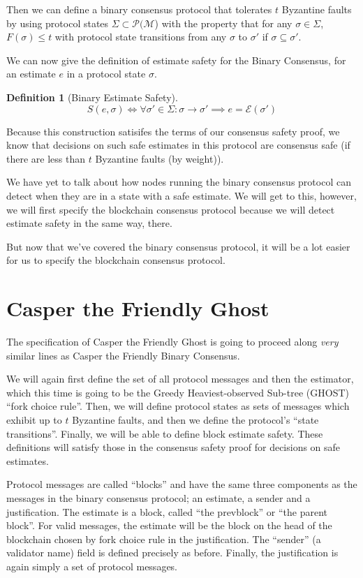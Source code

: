 \documentclass{article}
\theoremstyle{definition}
\newtheorem{defn}{Definition}[section]
\begin{document}
Then we can define a binary consensus protocol that tolerates $t$ Byzantine faults by using protocol states $\Sigma \subset \mathcal{P}(\mathcal{M}$) with the property that for any $\sigma \in \Sigma$, $F(\sigma) \leq t$ with protocol state transitions from any $\sigma$ to $\sigma'$ if $\sigma \subseteq \sigma'$. 

We can now give the definition of estimate safety for the Binary Consensus, for an estimate $e$ in a protocol state $\sigma$.

\begin{defn}[Binary Estimate Safety]
$$
S(e, \sigma) \iff \forall \sigma' \in \Sigma: \sigma \to \sigma' \implies e = \mathcal{E}(\sigma')
$$
\end{defn}

Because this construction satisifes the terms of our consensus safety proof, we know that decisions on such safe estimates in this protocol are consensus safe (if there are less than $t$ Byzantine faults (by weight)).

We have yet to talk about how nodes running the binary consensus protocol can detect when they are in a state with a safe estimate. We will get to this, however, we will first specify the blockchain consensus protocol because we will detect estimate safety in the same way, there.

But now that we've covered the binary consensus protocol, it will be a lot easier for us to specify the blockchain consensus protocol.


\section{Casper the Friendly Ghost}

The specification of Casper the Friendly Ghost is going to proceed along \emph{very} similar lines as Casper the Friendly Binary Consensus.

We will again first define the set of all protocol messages and then the estimator, which this time is going to be the Greedy Heaviest-observed Sub-tree (GHOST) ``fork choice rule''. Then, we will define protocol states as sets of messages which exhibit up to $t$ Byzantine faults, and then we define the protocol's ``state transitions''. Finally, we will be able to define block estimate safety. These definitions will satisfy those in the consensus safety proof for decisions on safe estimates.

Protocol messages are called ``blocks'' and have the same three components as the messages in the binary consensus protocol; an estimate, a sender and a justification. The estimate is a block, called ``the prevblock'' or ``the parent block''. For valid messages, the estimate will be the block on the head of the blockchain chosen by fork choice rule in the justification. The ``sender'' (a validator name) field is defined precisely as before. Finally, the justification is again simply a set of protocol messages.
\end{document}

